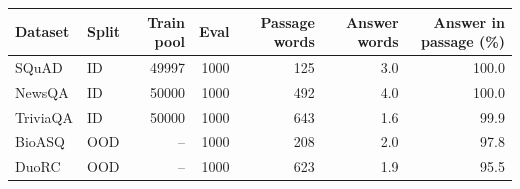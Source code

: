 \begin{tabular}{llrrrrr}
\toprule
Dataset & Split & Train pool & Eval & Passage words & Answer words & Answer in passage (\%) \\
\midrule
SQuAD & ID & 49997 & 1000 & 125 & 3.0 & 100.0 \\
NewsQA & ID & 50000 & 1000 & 492 & 4.0 & 100.0 \\
TriviaQA & ID & 50000 & 1000 & 643 & 1.6 & 99.9 \\
BioASQ & OOD & -- & 1000 & 208 & 2.0 & 97.8 \\
DuoRC & OOD & -- & 1000 & 623 & 1.9 & 95.5 \\
\bottomrule
\end{tabular}